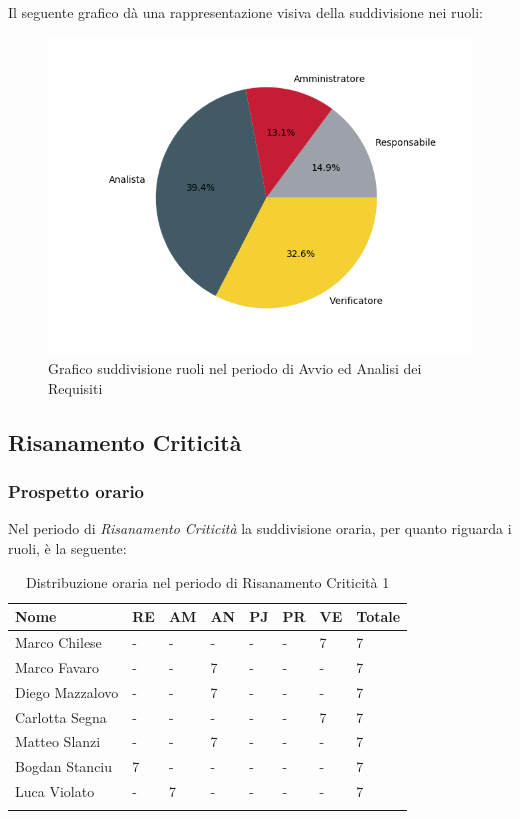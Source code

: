 Il seguente grafico dà una rappresentazione visiva della suddivisione nei ruoli:
\begin{figure}[H]
	\centering
  		\includegraphics[width=0.8\linewidth]{./images/torta_aar.png}
  		\caption{Grafico suddivisione ruoli nel periodo di Avvio ed Analisi dei Requisiti}
  		\label{fig:grafico suddivione ruoli periodo di Avvio ed analisi dei requisiti}
\end{figure}

\subsection{Risanamento Criticità}
\subsubsection{Prospetto orario}

Nel periodo di \textit{Risanamento Criticità} la suddivisione oraria, per quanto riguarda i ruoli, è la seguente:

\begin{longtable}{|C{.30\textwidth}|C{.06\textwidth}|C{.06\textwidth}|C{.06\textwidth} | C{.06\textwidth}| C{.06\textwidth} | C{.06\textwidth} | C{.10\textwidth} |}
\hline
\textbf{Nome} & \textbf{RE} & \textbf{AM} & \textbf{AN} & \textbf{PJ} & \textbf{PR} & \textbf{VE} & \textbf{Totale}\\
\hline 
Marco Chilese & - & - & - & - & - & 7 & 7 \\
\hline
Marco Favaro & - & - & 7 & - & - & - & 7 \\
\hline
Diego Mazzalovo & - & - & 7 & - & - & - & 7 \\
\hline
Carlotta Segna & - & - & - & - & - & 7 & 7 \\
\hline
Matteo Slanzi & - & - & 7 & - & - & - & 7 \\
\hline
Bogdan Stanciu & 7 & - & - & - & - & - & 7 \\
\hline
Luca Violato & - & 7 & - & - & - & - & 7 \\
\hline

\caption{Distribuzione oraria nel periodo di Risanamento Criticità 1}
\label{Distribuzione oraria del periodo di rc1}
\end{longtable}




